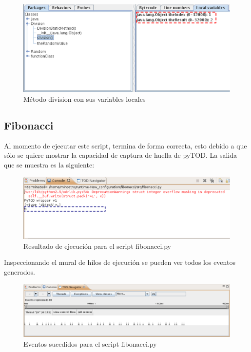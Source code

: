 \documentclass[12pt,legalpaper]{report}
\begin{document}
\begin{figure}[h]
	\centering
	\includegraphics[scale=0.6]{images/division/structureDivision.eps}
	\caption{Método division con sus variables locales}
\end{figure}

		\subsection{Fibonacci}
		
Al momento de ejecutar este script, termina de forma correcta, esto debido a que sólo se quiere mostrar la capacidad de captura de huella de pyTOD.  La salida que se muestra es la siguiente:

\begin{figure}[h]
	\centering
	\includegraphics[scale=0.6]{images/fibonacci/Exception.eps}
	\caption{Resultado de ejecución para el script fibonacci.py}
\end{figure}		

Inspeccionando el mural de hilos de ejecución se pueden ver todos los eventos generados.

\begin{figure}[h]
	\centering
	\includegraphics[scale=0.4]{images/fibonacci/threadMurals.eps}
	\caption{Eventos sucedidos para el script fibonacci.py}
\end{figure}
\end{document}
